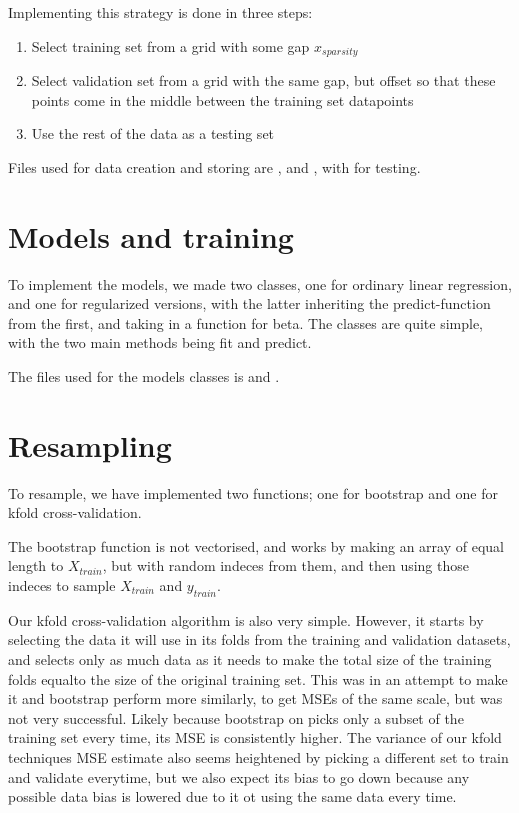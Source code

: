 \documentclass[11pt, a4paper]{report}
\begin{document}
Implementing this strategy is done in three steps:
\begin{enumerate}
    \item Select training set from a grid with some gap $x_{sparsity}$
    \item Select validation set from a grid with the same gap, but offset so that these points come in the middle between the training set datapoints
    \item Use the rest of the data as a testing set
\end{enumerate}

Files used for data creation and storing are ,  and , with  for testing.

\section{Models and training}

To implement the models, we made two classes, one for ordinary linear regression, and one for regularized versions, with the latter inheriting the predict-function from the first, and taking in a function for beta. The classes are quite simple, with the two main methods being fit and predict.

The files used for the models classes is  and .

\section{Resampling}

To resample, we have implemented two functions; one for bootstrap and one for kfold cross-validation.

The bootstrap function is not vectorised, and works by making an array of equal length to $X_{train}$, but with random indeces from them, and then using those indeces to sample $X_{train}$ and $y_{train}$.



Our kfold cross-validation algorithm is also very simple. However, it starts by selecting the data it will use in its folds from the training and validation datasets, and selects only as much data as it needs to make the total size of the training folds equalto the size of the original training set. This was in an attempt to make it and bootstrap perform more similarly, to get MSEs of the same scale, but was not very successful. Likely because bootstrap on picks only a subset of the training set every time, its MSE is consistently higher. The variance of our kfold techniques MSE estimate also seems heightened by picking a different set to train and validate everytime, but we also expect its bias to go down because any possible data bias is lowered due to it ot using the same data every time.
\end{document}
